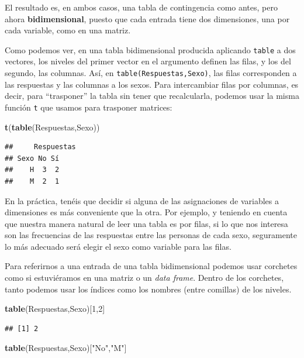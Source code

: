 \documentclass[]{book}
\newenvironment{Shaded}{\begin{snugshade}}{\end{snugshade}}
\newcommand{\DecValTok}[1]{\textcolor[rgb]{0.00,0.00,0.81}{#1}}
\newcommand{\KeywordTok}[1]{\textcolor[rgb]{0.13,0.29,0.53}{\textbf{#1}}}
\newcommand{\NormalTok}[1]{#1}
\newcommand{\StringTok}[1]{\textcolor[rgb]{0.31,0.60,0.02}{#1}}
\theoremstyle{definition}
\theoremstyle{definition}
\theoremstyle{definition}
\theoremstyle{remark}
\begin{document}
El resultado es, en ambos casos, una tabla de contingencia como antes, pero ahora \textbf{bidimensional}, puesto que cada entrada tiene dos dimensiones, una por cada variable, como en una matriz.

Como podemos ver, en una tabla bidimensional producida aplicando \texttt{table} a dos vectores, los niveles del primer vector en el argumento definen las filas, y los del segundo, las columnas. Así, en \texttt{table(Respuestas,Sexo)}, las filas corresponden a las respuestas y las columnas a los sexos.
Para intercambiar filas por columnas, es decir, para ``trasponer'' la tabla sin tener que recalcularla, podemos usar la misma función \texttt{t} que usamos para trasponer matrices:

\begin{Shaded}
\begin{Highlighting}[]
\KeywordTok{t}\NormalTok{(}\KeywordTok{table}\NormalTok{(Respuestas,Sexo))}
\end{Highlighting}
\end{Shaded}

\begin{verbatim}
##     Respuestas
## Sexo No Sí
##    H  3  2
##    M  2  1
\end{verbatim}

En la práctica, tenéis que decidir si alguna de las asignaciones de variables a dimensiones es más conveniente que la otra. Por ejemplo, y teniendo en cuenta que nuestra manera natural de leer una tabla es por filas, si lo que nos interesa son las frecuencias de las respuestas entre las personas de cada sexo, seguramente lo más adecuado será elegir el sexo como variable para las filas.

Para referirnos a una entrada de una tabla bidimensional podemos usar corchetes como si estuviéramos en una matriz o un \emph{data frame}. Dentro de los corchetes, tanto podemos usar los índices como los nombres (entre comillas) de los niveles.

\begin{Shaded}
\begin{Highlighting}[]
\KeywordTok{table}\NormalTok{(Respuestas,Sexo)[}\DecValTok{1}\NormalTok{,}\DecValTok{2}\NormalTok{]}
\end{Highlighting}
\end{Shaded}

\begin{verbatim}
## [1] 2
\end{verbatim}

\begin{Shaded}
\begin{Highlighting}[]
\KeywordTok{table}\NormalTok{(Respuestas,Sexo)[}\StringTok{"No"}\NormalTok{,}\StringTok{"M"}\NormalTok{]}
\end{Highlighting}
\end{Shaded}
\end{document}
